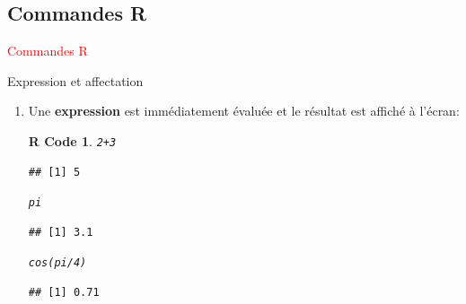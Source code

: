 \documentclass[11pt]{beamer}\usepackage[]{graphicx}\usepackage[]{color}
\makeatletter
\newcommand{\hlnum}[1]{\textcolor[rgb]{0.063,0.58,0.627}{#1}}%
\newcommand{\hlopt}[1]{\textcolor[rgb]{0.196,0.196,0.196}{#1}}%
\newcommand{\hlstd}[1]{\textcolor[rgb]{0.196,0.196,0.196}{#1}}%
\newcommand{\hlkwd}[1]{\textcolor[rgb]{0.78,0.227,0.412}{#1}}%
\newenvironment{kframe}{%
 \def\at@end@of@kframe{}%
 \ifinner\ifhmode%
  \def\at@end@of@kframe{\end{minipage}}%
  \begin{minipage}{\columnwidth}%
 \fi\fi%
 \def\FrameCommand##1{\hskip\@totalleftmargin \hskip-\fboxsep
 \colorbox{shadecolor}{##1}\hskip-\fboxsep
     \hskip-\linewidth \hskip-\@totalleftmargin \hskip\columnwidth}%
 \MakeFramed {\advance\hsize-\width
   \@totalleftmargin\z@ \linewidth\hsize
   \@setminipage}}%
 {\par\unskip\endMakeFramed%
 \at@end@of@kframe}
\newenvironment{knitrout}{}{} %
\newtheorem{rcode}{R Code}[section]
\newcounter{saveenumi}
\newcommand{\seti}{\setcounter{saveenumi}{\value{enumi}}}
\makeatother
\begin{document}
\subsection{Commandes R}

\begin{frame}
 \begin{center}
  \Huge{\textcolor{red}{Commandes R}}
 \end{center}
\end{frame}


\begin{frame}[fragile]{Expression et affectation} 
\begin{enumerate}
\item Une \textbf{expression} est immédiatement évaluée et le résultat est affiché à l’écran:
\pause
\begin{knitrout}
\color{fgcolor}\begin{kframe}
\begin{rcode}\begin{alltt}
\hlnum{2} \hlopt{+} \hlnum{3}
\end{alltt}
\begin{verbatim}
## [1] 5
\end{verbatim}
\begin{alltt}
\hlstd{pi}
\end{alltt}
\begin{verbatim}
## [1] 3.1
\end{verbatim}
\begin{alltt}
\hlkwd{cos}\hlstd{(pi}\hlopt{/}\hlnum{4}\hlstd{)}
\end{alltt}
\begin{verbatim}
## [1] 0.71
\end{verbatim}
\end{rcode}\end{kframe}
\end{knitrout}
\seti
\end{enumerate}

\end{frame}
\end{document}

